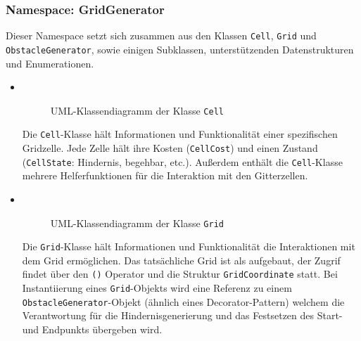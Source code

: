 \subsubsection{Namespace: GridGenerator}
\label{subsubsec:aufbau_backend_ueberblick_gridgen}
Dieser Namespace setzt sich zusammen aus den Klassen \texttt{Cell}, \texttt{Grid} und \texttt{ObstacleGenerator}, sowie einigen Subklassen, unterstützenden Datenstrukturen und Enumerationen.
\begin{itemize}
    \item {} \\
    \begin{figure}[H]
        \vspace{-0.5cm}
        \centering
        
        \caption{UML-Klassendiagramm der Klasse \texttt{Cell}}
        \label{fig:uml_cell}
    \end{figure}
    Die \texttt{Cell}-Klasse hält Informationen und Funktionalität einer spezifischen Gridzelle.
    Jede Zelle hält ihre Kosten (\texttt{CellCost}) und einen Zustand (\texttt{CellState}: Hindernis, begehbar, etc.).
    Außerdem enthält die \texttt{Cell}-Klasse mehrere Helferfunktionen für die Interaktion mit den Gitterzellen.

    \item {} \\
    \begin{figure}[H]
        \vspace{-0.5cm}
        \centering
        
        \caption{UML-Klassendiagramm der Klasse \texttt{Grid}}
        \label{fig:uml_grid}
    \end{figure}
    Die \texttt{Grid}-Klasse hält Informationen und Funktionalität die Interaktionen mit dem Grid ermöglichen.
    Das tatsächliche Grid ist als  aufgebaut, der Zugrif findet über den \texttt{()}
    Operator und die Struktur \texttt{GridCoordinate} statt.
    Bei Instantiierung eines \texttt{Grid}-Objekts wird eine Referenz zu einem \texttt{ObstacleGenerator}-Objekt (ähnlich eines Decorator-Pattern)
    welchem die Verantwortung für die Hindernisgenerierung und das Festsetzen des Start- und Endpunkts übergeben wird.


\end{itemize}
